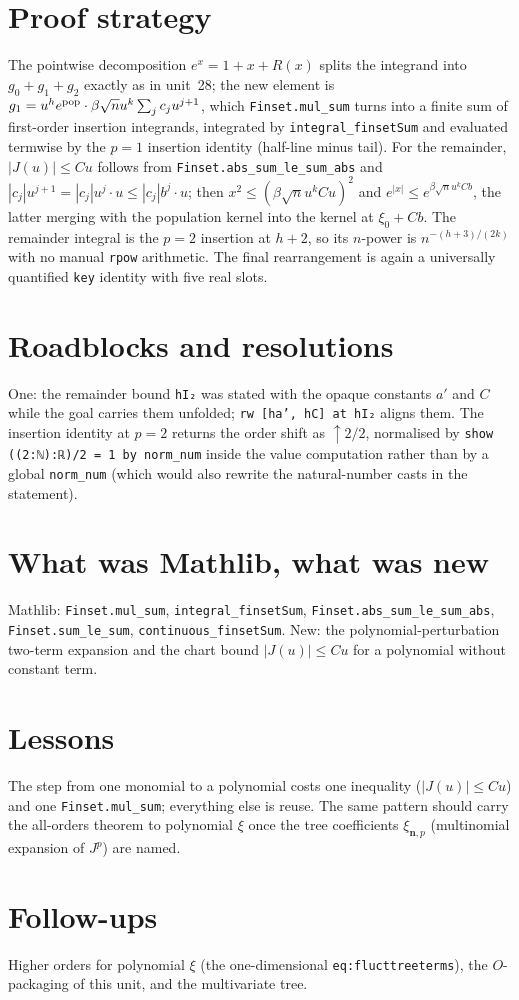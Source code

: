 \documentclass[11pt]{article}
\begin{document}
\section{Proof strategy}
The pointwise decomposition $e^{x}=1+x+R(x)$ splits the integrand into $g_0+g_1+g_2$ exactly as in
unit~28; the new element is $g_1=u^he^{\rm pop}\cdot\beta\sqrt nu^k\sum_jc_ju^{j+1}$, which
\texttt{Finset.mul\_sum} turns into a finite sum of first-order insertion integrands, integrated by
\texttt{integral\_finsetSum} and evaluated termwise by the $p=1$ insertion identity (half-line minus tail).
For the remainder, $|J(u)|\le Cu$ follows from \texttt{Finset.abs\_sum\_le\_sum\_abs} and
$|c_j|u^{j+1}=|c_j|u^j\cdot u\le|c_j|b^j\cdot u$; then $x^2\le(\beta\sqrt nu^kCu)^2$ and
$e^{|x|}\le e^{\beta\sqrt nu^kCb}$, the latter merging with the population kernel into the kernel at
$\xi_0+Cb$. The remainder integral is the $p=2$ insertion at $h+2$, so its $n$-power is
$n^{-(h+3)/(2k)}$ with no manual \texttt{rpow} arithmetic. The final rearrangement is again a
universally quantified \texttt{key} identity with five real slots.

\section{Roadblocks and resolutions}
One: the remainder bound \texttt{hI₂} was stated with the opaque constants $a'$ and $C$ while the goal
carries them unfolded; \texttt{rw [ha', hC] at hI₂} aligns them. The insertion identity at $p=2$ returns
the order shift as $\uparrow 2/2$, normalised by \texttt{show ((2:ℕ):ℝ)/2 = 1 by norm\_num} inside the
value computation rather than by a global \texttt{norm\_num} (which would also rewrite the
natural-number casts in the statement).

\section{What was Mathlib, what was new}
Mathlib: \texttt{Finset.mul\_sum}, \texttt{integral\_finsetSum}, \texttt{Finset.abs\_sum\_le\_sum\_abs},
\texttt{Finset.sum\_le\_sum}, \texttt{continuous\_finsetSum}. New: the polynomial-perturbation two-term
expansion and the chart bound $|J(u)|\le Cu$ for a polynomial without constant term.

\section{Lessons}
The step from one monomial to a polynomial costs one inequality ($|J(u)|\le Cu$) and one
\texttt{Finset.mul\_sum}; everything else is reuse. The same pattern should carry the all-orders
theorem to polynomial $\xi$ once the tree coefficients $\xi_{\mathbf n,p}$ (multinomial expansion of
$J^p$) are named.

\section{Follow-ups}
Higher orders for polynomial $\xi$ (the one-dimensional \texttt{eq:flucttreeterms}), the $O$-packaging
of this unit, and the multivariate tree.
\end{document}
